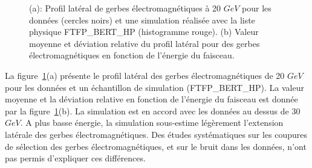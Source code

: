 \begin{figure}[!ht]
  \caption{(a): Profil latéral de gerbes électromagnétiques à 20 $GeV$ pour les données (cercles noirs) et une simulation réalisée avec la liste physique FTFP\_BERT\_HP (histogramme rouge). (b) Valeur moyenne et déviation relative du profil latéral pour des gerbes électromagnétiques en fonction de l'énergie du faisceau.}
  \label{fig.rad_e-}
\end{figure}
La figure~\ref{fig.rad_e-}(a) présente le profil latéral des gerbes électromagnétiques de 20 $GeV$ pour les données et un échantillon de simulation (FTFP\_BERT\_HP). La valeur moyenne et la déviation relative en fonction de l'énergie du faisceau est donnée par la figure~\ref{fig.rad_e-}(b). La simulation est en accord avec les données au dessus de 30 $GeV$. A plus basse énergie, la simulation sous-estime légèrement l’extension latérale des gerbes électromagnétiques. Des études systématiques sur les coupures de sélection des gerbes électromagnétiques, et sur le bruit dans les données, n'ont pas permis d'expliquer ces différences.

